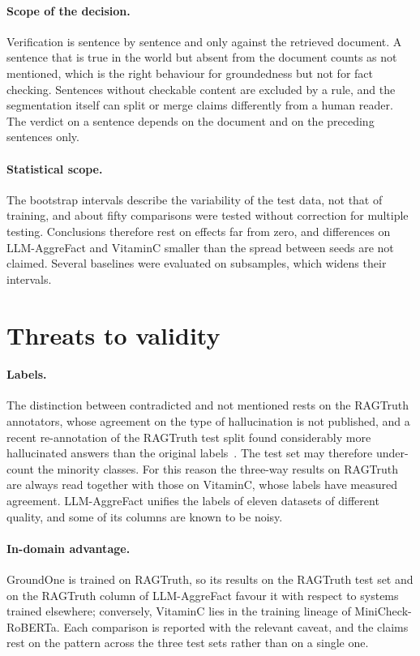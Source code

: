\paragraph{Scope of the decision.} Verification is sentence by sentence and only against the retrieved document. A
sentence that is true in the world but absent from the document counts as not mentioned, which is the right behaviour for
groundedness but not for fact checking. Sentences without checkable content are excluded by a rule, and the segmentation
itself can split or merge claims differently from a human reader. The verdict on a sentence depends on the document and on
the preceding sentences only.

\paragraph{Statistical scope.} The bootstrap intervals describe the variability of the test data, not that of training,
and about fifty comparisons were tested without correction for multiple testing. Conclusions therefore rest on effects far
from zero, and differences on LLM-AggreFact and VitaminC smaller than the spread between seeds are not claimed. Several
baselines were evaluated on subsamples, which widens their intervals.

\section{Threats to validity}
\label{sec:disc-threats}

\paragraph{Labels.} The distinction between contradicted and not mentioned rests on the RAGTruth annotators, whose
agreement on the type of hallucination is not published, and a recent re-annotation of the RAGTruth test split found
considerably more hallucinated answers than the original labels~\cite{yu2026retromorphic}. The test set may therefore
under-count the minority classes. For this reason the three-way results on RAGTruth are always read together with those
on VitaminC, whose labels have measured agreement. LLM-AggreFact unifies the labels of eleven datasets of different
quality, and some of its columns are known to be noisy.

\paragraph{In-domain advantage.} GroundOne is trained on RAGTruth, so its results on the RAGTruth test set and on the
RAGTruth column of LLM-AggreFact favour it with respect to systems trained elsewhere; conversely, VitaminC lies in the
training lineage of MiniCheck-RoBERTa. Each comparison is reported with the relevant caveat, and the claims rest on the
pattern across the three test sets rather than on a single one.


